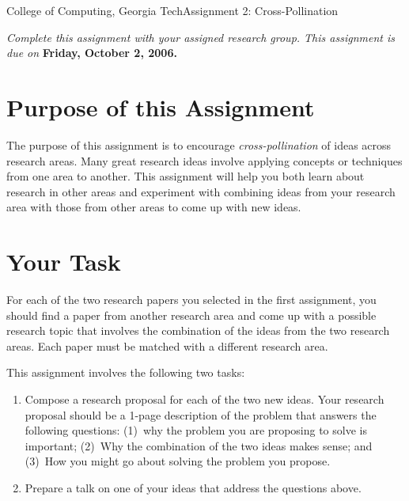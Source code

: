 \documentclass[11pt]{article}
\begin{document}


{College of Computing, Georgia Tech}{Assignment 2: Cross-Pollination}

{\em Complete this assignment with your assigned research group.  This
  assignment is due on} {\bf Friday, October 2, 2006.}

\section{Purpose of this Assignment}

The purpose of this assignment is to encourage {\em cross-pollination}
of ideas across research areas.  Many great research ideas involve
applying concepts or techniques from one area to another.  This
assignment will help you both learn about research in other areas and
experiment with combining ideas from your research area with those from
other areas to come up with new ideas.


\section{Your Task}

For each of the two research papers you selected in the first
assignment, you should find a paper from another research area and come
up with a possible research topic that involves the combination of the
ideas from the two research areas.  Each paper must be matched with a
different research area.  

This assignment involves the following two tasks:

\begin{enumerate}
\itemsep=-1pt
\item Compose a research proposal for each of the two new ideas.  Your
research proposal should be a 1-page description of the problem that
answers the following questions: (1)~why the problem you are proposing
to solve is important; (2)~Why the combination of the two ideas makes
sense; and (3)~How you might go about solving the problem you propose.
\item Prepare a talk on one of your ideas that address the questions
  above.
\end{enumerate}
\end{document}
